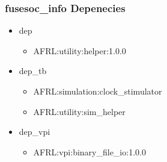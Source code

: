 \subsubsection{fusesoc\_info Depenecies}
\begin{itemize}
\item dep
	\begin{itemize}
	\item AFRL:utility:helper:1.0.0
	\end{itemize}
\item dep\_tb
	\begin{itemize}
	\item AFRL:simulation:clock\_stimulator
	\item AFRL:utility:sim\_helper
	\end{itemize}
\item dep\_vpi
	\begin{itemize}
	\item AFRL:vpi:binary\_file\_io:1.0.0
	\end{itemize}
\end{itemize}
